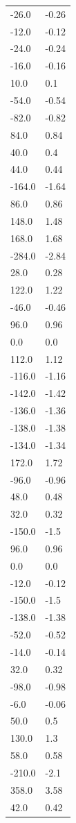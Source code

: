 \begin{longtable}{ll}
-26.0 & -0.26 \\
-12.0 & -0.12 \\
-24.0 & -0.24 \\
-16.0 & -0.16 \\
10.0 & 0.1 \\
-54.0 & -0.54 \\
-82.0 & -0.82 \\
84.0 & 0.84 \\
40.0 & 0.4 \\
44.0 & 0.44 \\
-164.0 & -1.64 \\
86.0 & 0.86 \\
148.0 & 1.48 \\
168.0 & 1.68 \\
-284.0 & -2.84 \\
28.0 & 0.28 \\
122.0 & 1.22 \\
-46.0 & -0.46 \\
96.0 & 0.96 \\
0.0 & 0.0 \\
112.0 & 1.12 \\
-116.0 & -1.16 \\
-142.0 & -1.42 \\
-136.0 & -1.36 \\
-138.0 & -1.38 \\
-134.0 & -1.34 \\
172.0 & 1.72 \\
-96.0 & -0.96 \\
48.0 & 0.48 \\
32.0 & 0.32 \\
-150.0 & -1.5 \\
96.0 & 0.96 \\
0.0 & 0.0 \\
-12.0 & -0.12 \\
-150.0 & -1.5 \\
-138.0 & -1.38 \\
-52.0 & -0.52 \\
-14.0 & -0.14 \\
32.0 & 0.32 \\
-98.0 & -0.98 \\
-6.0 & -0.06 \\
50.0 & 0.5 \\
130.0 & 1.3 \\
58.0 & 0.58 \\
-210.0 & -2.1 \\
358.0 & 3.58 \\
42.0 & 0.42 \\

\end{longtable}
